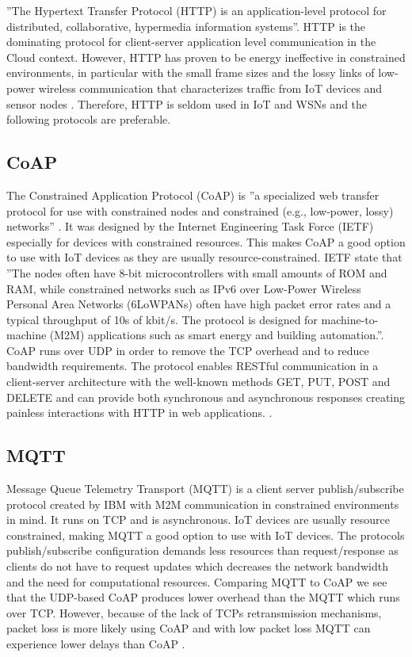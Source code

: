 \documentclass[]{uiophd}
\begin{document}
''The Hypertext Transfer Protocol (HTTP) is an application-level protocol for distributed, collaborative, hypermedia information systems''\cite{HTTP1996}. HTTP is the dominating protocol for client-server application level communication in the Cloud context. However, HTTP has proven to be energy ineffective in constrained environments, in particular with the small frame sizes and the lossy links of low-power wireless communication that characterizes traffic from IoT devices and sensor nodes \cite{karagiannis2015survey} \cite{7030106}. Therefore, HTTP is seldom used in IoT and WSNs and the following protocols are preferable.

\subsection{CoAP}
The Constrained Application Protocol (CoAP) is ''a specialized web transfer protocol for use with constrained nodes and constrained (e.g., low-power, lossy) networks'' \cite{rfc7252}. It was designed by the Internet Engineering Task Force (IETF) especially for devices with constrained resources. This makes CoAP a good option to use with IoT devices as they are usually resource-constrained. IETF state that ''The nodes often have 8-bit microcontrollers with small amounts of ROM and RAM, while constrained networks such as IPv6 over Low-Power Wireless Personal Area Networks (6LoWPANs) often have high packet error rates and a typical throughput of 10s of kbit/s.  The protocol is designed for machine-to-machine (M2M) applications such as smart energy and building automation.''\cite{rfc7252}. CoAP runs over UDP in order to remove the TCP overhead and to reduce bandwidth requirements. The protocol enables RESTful communication in a client-server architecture with the well-known methods GET, PUT, POST and DELETE and can provide both synchronous and asynchronous responses creating painless interactions with HTTP in web applications.
\cite{rfc7252}
\cite{karagiannis2015survey}
\cite{7030106}.

\subsection{MQTT}
Message Queue Telemetry Transport (MQTT) is a client server publish/subscribe protocol created by IBM with M2M communication in constrained environments in mind. It runs on TCP and is asynchronous. IoT devices are usually resource constrained, making MQTT a good option to use with IoT devices. The protocols publish/subscribe configuration demands less resources than request/response as clients do not have to request updates which decreases the network bandwidth and the need for computational resources. Comparing MQTT to CoAP we see that the UDP-based CoAP produces lower overhead than the MQTT which runs over TCP. However, because of the lack of TCPs retransmission mechanisms, packet loss is more likely using CoAP and with low packet loss MQTT can experience lower delays than CoAP \cite{karagiannis2015survey}.
\end{document}
